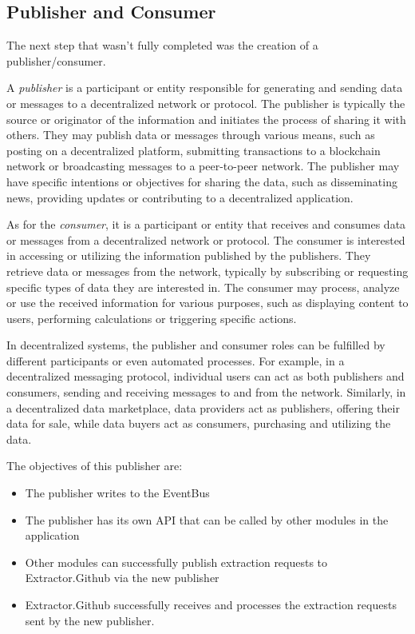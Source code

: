 \subsection{Publisher and Consumer}

The next step that wasn't fully completed was the creation of a publisher/consumer.\newline

A \textit{publisher} is a participant or entity responsible for generating and sending data or messages to a decentralized network or protocol.
The publisher is typically the source or originator of the information and initiates the process of sharing it with others.
They may publish data or messages through various means, such as posting on a decentralized platform, submitting transactions to a blockchain network or broadcasting messages to a peer-to-peer network.
The publisher may have specific intentions or objectives for sharing the data, such as disseminating news, providing updates or contributing to a decentralized application.\newline

As for the \textit{consumer}, it  is a participant or entity that receives and consumes data or messages from a decentralized network or protocol.
The consumer is interested in accessing or utilizing the information published by the publishers.
They retrieve data or messages from the network, typically by subscribing or requesting specific types of data they are interested in.
The consumer may process, analyze or use the received information for various purposes, such as displaying content to users, performing calculations or triggering specific actions.\newline

In decentralized systems, the publisher and consumer roles can be fulfilled by different participants or even automated processes. For example, in a decentralized messaging protocol, individual users can act as both publishers and consumers, sending and receiving messages to and from the network. Similarly, in a decentralized data marketplace, data providers act as publishers, offering their data for sale, while data buyers act as consumers, purchasing and utilizing the data.\newline

The objectives of this publisher are:

\begin{itemize}
    \item The publisher writes to the EventBus
    \item The publisher has its own API that can be called by other modules in the application
    \item Other modules can successfully publish extraction requests to Extractor.Github via the new publisher
    \item Extractor.Github successfully receives and processes the extraction requests sent by the new publisher.
\end{itemize}


